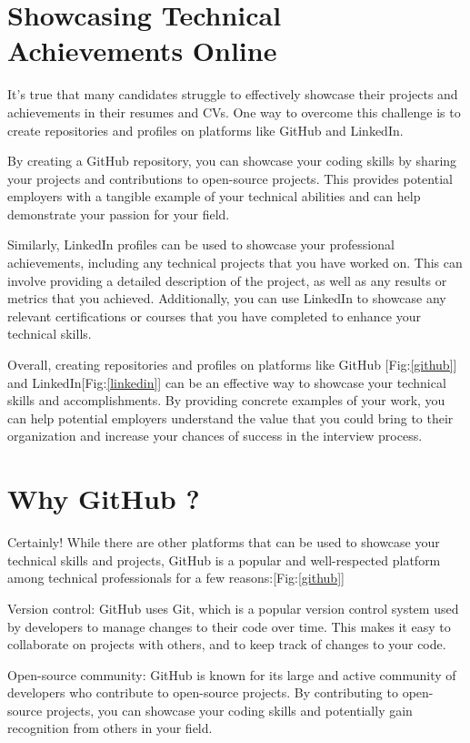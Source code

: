 \documentclass[12pt]{article}
\begin{document}
\section{Showcasing Technical Achievements Online}
It's true that many candidates struggle to effectively showcase their projects and achievements in their resumes and CVs. One way to overcome this challenge is to create repositories and profiles on platforms like GitHub and LinkedIn.


By creating a GitHub repository, you can showcase your coding skills by sharing your projects and contributions to open-source projects. This provides potential employers with a tangible example of your technical abilities and can help demonstrate your passion for your field.

Similarly, LinkedIn profiles can be used to showcase your professional achievements, including any technical projects that you have worked on. This can involve providing a detailed description of the project, as well as any results or metrics that you achieved. Additionally, you can use LinkedIn to showcase any relevant certifications or courses that you have completed to enhance your technical skills.

Overall, creating repositories and profiles on platforms like GitHub [Fig:\ref{github}] and LinkedIn[Fig:\ref{linkedin}] can be an effective way to showcase your technical skills and accomplishments. By providing concrete examples of your work, you can help potential employers understand the value that you could bring to their organization and increase your chances of success in the interview process.

\section{Why GitHub ?} 
Certainly! While there are other platforms that can be used to showcase your technical skills and projects, GitHub is a popular and well-respected platform among technical professionals for a few reasons:[Fig:\ref{github}]

Version control: GitHub uses Git, which is a popular version control system used by developers to manage changes to their code over time. This makes it easy to collaborate on projects with others, and to keep track of changes to your code.

Open-source community: GitHub is known for its large and active community of developers who contribute to open-source projects. By contributing to open-source projects, you can showcase your coding skills and potentially gain recognition from others in your field.
\end{document}

